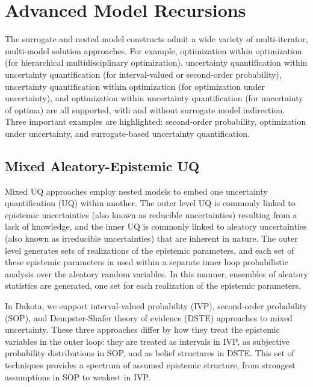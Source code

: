 \chapter{Advanced Model Recursions} \label{adv_models}


The surrogate and nested model constructs admit a wide variety of
multi-iterator, multi-model solution approaches.  For example,
optimization within optimization (for hierarchical multidisciplinary
optimization), uncertainty quantification within uncertainty
quantification (for interval-valued or second-order probability), uncertainty
quantification within optimization (for optimization under
uncertainty), and optimization within uncertainty quantification (for
uncertainty of optima) are all supported, with and without surrogate
model indirection.  Three important examples are highlighted:
second-order probability, optimization under uncertainty, and surrogate-based
uncertainty quantification.

\section{Mixed Aleatory-Epistemic UQ} \label{adv_models:mixed_uq}

Mixed UQ approaches employ nested models to embed one uncertainty
quantification (UQ) within another.  The outer level UQ is commonly
linked to epistemic uncertainties (also known as reducible
uncertainties) resulting from a lack of knowledge, and the inner UQ is
commonly linked to aleatory uncertainties (also known as irreducible
uncertainties) that are inherent in nature. The outer level generates
sets of realizations of the epistemic parameters, and each set of
these epistemic parameters in used within a separate inner loop
probabilistic analysis over the aleatory random variables.  In this
manner, ensembles of aleatory statistics are generated, one set for
each realization of the epistemic parameters.  %

In Dakota, we support interval-valued probability (IVP), second-order
probability (SOP), and Dempster-Shafer theory of evidence (DSTE)
approaches to mixed uncertainty.  These three approaches differ by how
they treat the epistemic variables in the outer loop: they are treated
as intervals in IVP, as subjective probability distributions in SOP,
and as belief structures in DSTE.  This set of techniques provides a
spectrum of assumed epistemic structure, from strongest assumptions in
SOP to weakest in IVP.


